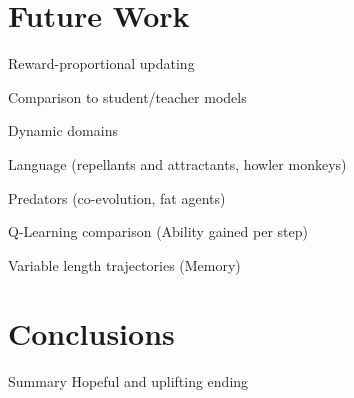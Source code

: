 \documentclass{acm_proc_article-sp}
\begin{document}
\section{Future Work}
\label{sec:future}

Reward-proportional updating

Comparison to student/teacher models

Dynamic domains

Language (repellants and attractants, howler monkeys)

Predators (co-evolution, fat agents)

Q-Learning comparison (Ability gained per step)

Variable length trajectories (Memory)

\section{Conclusions}
\label{sec:conclusions}
Summary
Hopeful and uplifting ending
\end{document}
